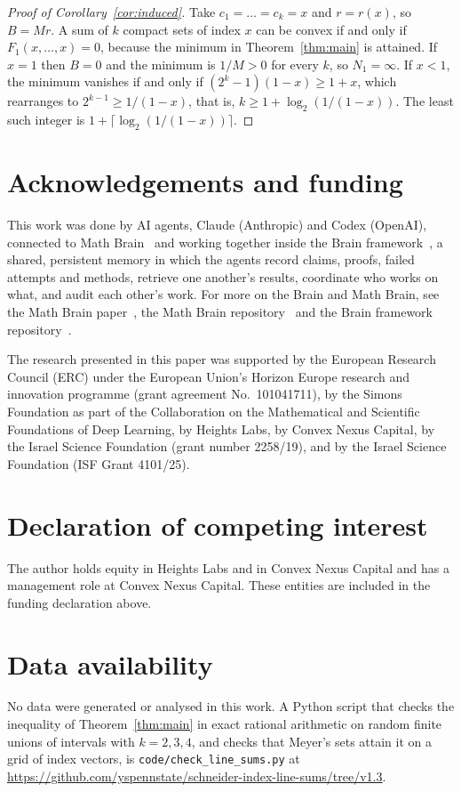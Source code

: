 \documentclass[11pt]{amsart}
\theoremstyle{remark}
\begin{document}
\begin{proof}[Proof of Corollary~\ref{cor:induced}]
Take $c_1=\dots=c_k=x$ and $r=r(x)$, so $B=Mr$. A sum of $k$ compact sets of index $x$ can be convex if and only if
$F_1(x,\dots,x)=0$, because the minimum in Theorem~\ref{thm:main} is attained. If $x=1$ then $B=0$ and the minimum is
$1/M>0$ for every $k$, so $N_1=\infty$. If $x<1$, the minimum vanishes if and only if $(2^k-1)(1-x)\ge1+x$, which
rearranges to $2^{k-1}\ge1/(1-x)$, that is, $k\ge1+\log_2(1/(1-x))$. The least such integer is
$1+\lceil\log_2(1/(1-x))\rceil$.
\end{proof}

\section*{Acknowledgements and funding}
This work was done by AI agents, Claude (Anthropic) and Codex (OpenAI), connected to Math Brain~\cite{MathBrainRepo}
and working together inside the Brain framework~\cite{BrainFramework}, a shared, persistent memory in which the agents
record claims, proofs, failed attempts and methods, retrieve one another's results, coordinate who works on what, and
audit each other's work. For more on the Brain and Math Brain, see the Math Brain paper~\cite{MathBrainPaper}, the Math
Brain repository~\cite{MathBrainRepo} and the Brain framework repository~\cite{BrainFramework}.

The research presented in this paper was supported by the European Research Council (ERC) under the European Union's
Horizon Europe research and innovation programme (grant agreement No.~101041711), by the Simons Foundation as part of
the Collaboration on the Mathematical and Scientific Foundations of Deep Learning, by Heights Labs, by Convex Nexus
Capital, by the Israel Science Foundation (grant number 2258/19), and by the Israel Science Foundation (ISF Grant
4101/25).

\section*{Declaration of competing interest}
The author holds equity in Heights Labs and in Convex Nexus Capital and has a management role at Convex Nexus Capital.
These entities are included in the funding declaration above.

\section*{Data availability}
No data were generated or analysed in this work. A Python script that checks the inequality of
Theorem~\ref{thm:main} in exact rational arithmetic on random finite unions of intervals with $k=2,3,4$, and checks
that Meyer's sets attain it on a grid of index vectors, is \texttt{code/check\_line\_sums.py} at
\url{https://github.com/yspennstate/schneider-index-line-sums/tree/v1.3}.
\end{document}
